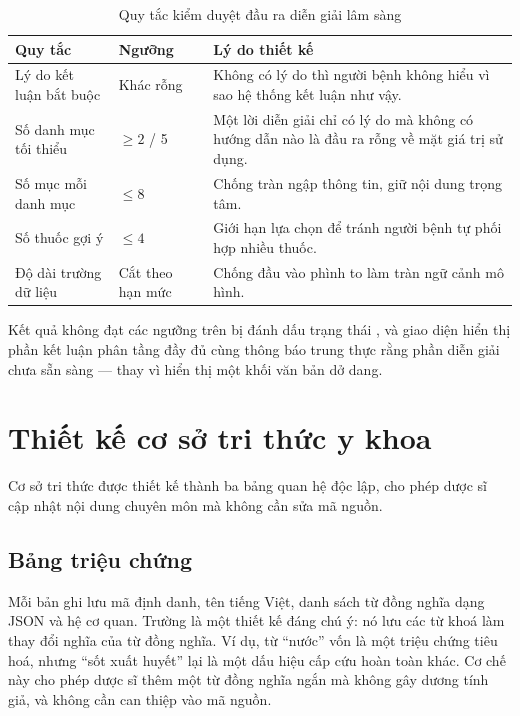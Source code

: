 \begin{table}[H]
\centering
\caption{Quy tắc kiểm duyệt đầu ra diễn giải lâm sàng}
\label{tab:sanitize}
\small
\begin{tabular}{|p{4.2cm}|p{3.5cm}|p{6.6cm}|}
\toprule
\textbf{Quy tắc} & \textbf{Ngưỡng} & \textbf{Lý do thiết kế} \\
\midrule
Lý do kết luận bắt buộc & Khác rỗng & Không có lý do thì người bệnh không
hiểu vì sao hệ thống kết luận như vậy. \\
Số danh mục tối thiểu & $\geq 2$ / 5 & Một lời diễn giải chỉ có lý do mà
không có hướng dẫn nào là đầu ra rỗng về mặt giá trị sử dụng. \\
Số mục mỗi danh mục & $\leq 8$ & Chống tràn ngập thông tin, giữ nội dung
trọng tâm. \\
Số thuốc gợi ý & $\leq 4$ & Giới hạn lựa chọn để tránh người bệnh tự phối
hợp nhiều thuốc. \\
Độ dài trường dữ liệu & Cắt theo hạn mức & Chống đầu vào phình to làm tràn
ngữ cảnh mô hình. \\
\bottomrule
\end{tabular}
\end{table}

Kết quả không đạt các ngưỡng trên bị đánh dấu trạng thái , và
giao diện hiển thị phần kết luận phân tầng đầy đủ cùng thông báo trung thực
rằng phần diễn giải chưa sẵn sàng — thay vì hiển thị một khối văn bản dở dang.

\section{Thiết kế cơ sở tri thức y khoa}

Cơ sở tri thức được thiết kế thành ba bảng quan hệ độc lập, cho phép dược sĩ
cập nhật nội dung chuyên môn mà không cần sửa mã nguồn.

\subsection{Bảng triệu chứng }

Mỗi bản ghi lưu mã định danh, tên tiếng Việt, danh sách từ đồng nghĩa dạng JSON
và hệ cơ quan. Trường  là một thiết kế đáng chú ý: nó lưu các
từ khoá làm thay đổi nghĩa của từ đồng nghĩa. Ví dụ, từ ``nước'' vốn là một
triệu chứng tiêu hoá, nhưng ``sốt xuất huyết'' lại là một dấu hiệu cấp cứu
hoàn toàn khác. Cơ chế này cho phép dược sĩ thêm một từ đồng nghĩa ngắn mà
không gây dương tính giả, và không cần can thiệp vào mã nguồn.

